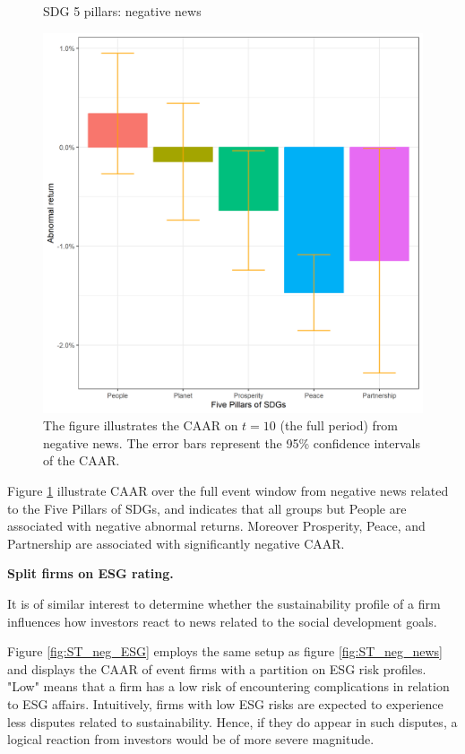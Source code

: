 \begin{figure} [H]
    \centering
    \caption{SDG 5 pillars: negative news}
    \includegraphics[scale=0.6]{Projekt/1.Figures analysis/ST_negative_sdg_bar_groups_0.png}
    \caption*{\footnotesize The figure illustrates the CAAR on $t = 10$ (the full period) from negative news. The error bars represent the 95\% confidence intervals of the CAAR.}
    \label{fig:ST_neg_bar}
\end{figure}


Figure \ref{fig:ST_neg_bar} illustrate CAAR over the full event window from negative news related to the Five Pillars of SDGs, and indicates that all groups but People are associated with negative abnormal returns. Moreover Prosperity, Peace, and Partnership are associated with significantly negative CAAR.      

\noindent \textbf{Split firms on ESG rating.} 

It is of similar interest to determine whether the sustainability profile of a firm influences how investors react to news related to the social development goals. 

Figure \ref{fig:ST_neg_ESG} employs the same setup as figure \ref{fig:ST_neg_news} and displays the CAAR of event firms with a partition on ESG risk profiles. "Low" means that a firm has a low risk of encountering complications in relation to ESG affairs. Intuitively, firms with low ESG risks are expected to experience less disputes related to sustainability. Hence, if they do appear in such disputes, a logical reaction from investors would be of more severe magnitude. 

